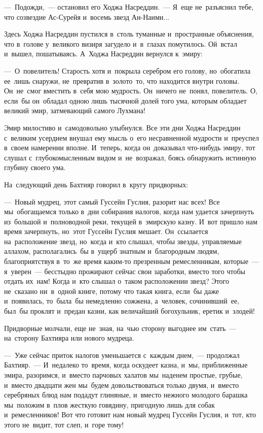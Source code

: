 \documentclass[12pt,a4paper]{book}
\begin{document}
—~Подожди,~— остановил его Ходжа Насреддин.~— Я~еще не~разъяснил тебе, что созвездие Ас-Сурейя и~восемь звезд Ан-Наими...

Здесь Ходжа Насреддин пустился в~столь туманные и~пространные объяснения, что в~голове у~великого визиря загудело и~в~глазах помутилось. Ой~встал и~вышел, пошатываясь. А~Ходжа Насреддин вернулся к~эмиру:

—~О~повелитель! Старость хотя и~покрыла серебром его голову, но~обогатила ее~лишь снаружи, не~превратив в~золото~то, что находится внутри головы. Он~не~смог вместить в~себя мою мудрость. Он~ничего не~понял, повелитель. О, если~бы он~обладал одною лишь тысячной долей того ума, которым обладает великий эмир, затмевающий самого Лухмана!

Эмир милостиво и~самодовольно улыбнулся. Все эти дни Ходжа Насреддин с~великим усердием внушал ему мысль о~его несравненной мудрости и~преуспел в~своем намерении вполне. И~теперь, когда он~доказывал что-нибудь эмиру, тот слушал с~глубокомысленным видом и~не~возражал, боясь обнаружить истинную глубину своего ума.

На~следующий день Бахтияр говорил в~кругу придворных:

—~Новый мудрец, этот самый Гуссейн Гуслия, разорит нас всех! Все мы~обогащаемся только в~дни собирания налогов, когда нам удается зачерпнуть из~большой и~полноводной реки, текущей в~эмирскую казну. И~вот пришло нам время зачерпнуть, но~этот Гуссейн Гуслия мешает. Он~ссылается на~расположение звезд, но~когда и~кто слышал, чтобы звезды, управляемые аллахом, располагались~бы в~ущерб знатным и~благородным людям, благоприятствуя в~то~же время каким-то презренным ремесленникам, которые~— я~уверен~— бесстыдно прожирают сейчас свои заработки, вместо того чтобы отдать их~нам! Когда и~кто слышал о~таком расположении звезд? Этого не~сказано ни~в~одной книге, потому что такая книга, если~бы даже и~появилась, то~была~бы немедленно сожжена, а~человек, сочинивший~ее, был~бы проклят и~предан казни, как величайший богохульник, еретик и~злодей!

Придворные молчали, еще не~зная, на~чью сторону выгоднее им~стать~— на~сторону Бахтияра или нового мудреца.

—~Уже сейчас приток налогов уменьшается с~каждым днем,~— продолжал Бахтияр.~— И~недалеко то~время, когда оскудеет казна, и~мы, приближенные эмира, разоримся, и~вместо парчовых халатов мы~наденем простые, грубые, и~вместо двадцати жен мы~будем довольствоваться только двумя, и~вместо серебряных блюд нам подадут глиняные, и~вместо нежного молодого барашка мы~положим в~плов жесткую говядину, пригодную лишь для собак и~ремесленников! Вот что готовит нам новый мудрец Гуссейн Гуслия, и~тот, кто этого не~видит, тот слеп, и~горе тому!
\end{document}
